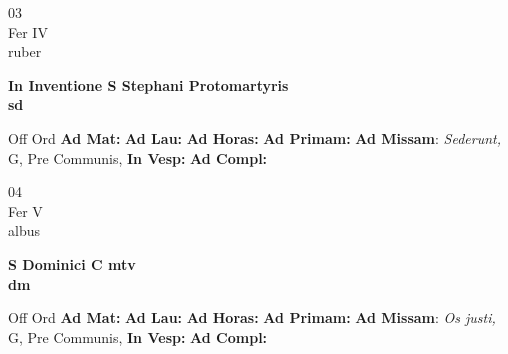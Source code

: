 \documentclass[10pt, openany]{book}
\begin{document}
    \begin{center}
        \begin{minipage}{3.5in}
            \vspace{2em}
            \begin{minipage}{0.5in}
                {\Huge 03} \\
                {\normalsize Fer IV} \\
                {\normalsize ruber}
            \end{minipage}
            \begin{minipage}{3.0in}
                \textbf{ \large In Inventione S Stephani Protomartyris \\
                \textnormal{\normalsize sd}} \\ 
            \end{minipage}
            \begin{justify}Off Ord
                \textbf{Ad Mat: }
                \textbf{Ad Lau: }
                \textbf{Ad Horas: }
                \textbf{Ad Primam: }\textbf{Ad Missam}: \textit{Sederunt,} G, Pre Communis,  
                \textbf{In Vesp: }
                \textbf{Ad Compl: }
            \end{justify}
        \end{minipage}
    \end{center}

    \begin{center}
        \begin{minipage}{3.5in}
            \vspace{2em}
            \begin{minipage}{0.5in}
                {\Huge 04} \\
                {\normalsize Fer V} \\
                {\normalsize albus}
            \end{minipage}
            \begin{minipage}{3.0in}
                \textbf{ \large S Dominici C mtv \\
                \textnormal{\normalsize dm}} \\ 
            \end{minipage}
            \begin{justify}Off Ord
                \textbf{Ad Mat: }
                \textbf{Ad Lau: }
                \textbf{Ad Horas: }
                \textbf{Ad Primam: }\textbf{Ad Missam}: \textit{Os justi,} G, Pre Communis,  
                \textbf{In Vesp: }
                \textbf{Ad Compl: }
            \end{justify}
        \end{minipage}
    \end{center}
\end{document}
